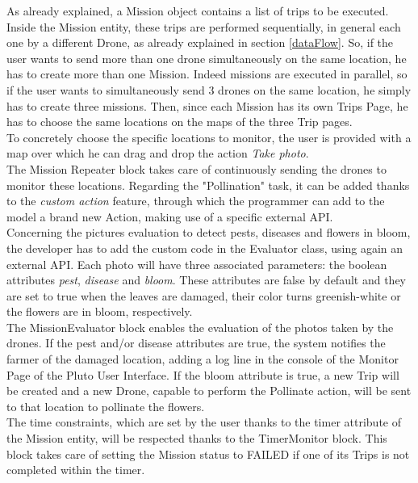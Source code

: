 As already explained, a Mission object contains a list of trips to be executed.
Inside the Mission entity, these trips are performed sequentially, in general each one by a different Drone, as already explained in section \ref{dataFlow}.
So, if the user wants to send more than one drone simultaneously on the same location, he has to create more than one Mission.
Indeed missions are executed in parallel, so if the user wants to simultaneously send 3 drones on the same location, he simply has to create three missions.
Then,  since each Mission has its own Trips Page, he has to choose the same locations on the maps of the three Trip pages.
\\

To concretely choose the specific locations to monitor, the user is provided with a map over which he can drag and drop the action \textit{Take photo}.
\\

The Mission Repeater block takes care of continuously sending the drones to monitor these locations.
Regarding the "Pollination" task, it can be added thanks to the \textit{custom action} feature, through which the programmer can add to the model a brand new Action, making use of a specific external API.
\\

Concerning the pictures evaluation to detect pests, diseases and flowers in bloom, the developer has to add the custom code in the Evaluator class, using again an external API. 
Each photo will have three associated parameters: the boolean attributes \textit{pest}, \textit{disease} and \textit{bloom}.
These attributes are false by default and they are set to true when the leaves are damaged, their color turns greenish-white or the flowers are in bloom, respectively. 
\\

The MissionEvaluator block enables the evaluation of the photos taken by the drones. If the pest and/or disease attributes are true, the system notifies the farmer of the damaged location, adding a log line in the console of the Monitor Page of the Pluto User Interface.
If the bloom attribute is true, a new Trip will be created and a new Drone, capable to perform the Pollinate action, will be sent to that location to pollinate the flowers.
\\

The time constraints, which are set by the user thanks to the timer attribute of the Mission entity, will be respected thanks to the TimerMonitor block.
This block takes care of setting the Mission status to FAILED if one of its Trips is not completed within the timer.
\\

